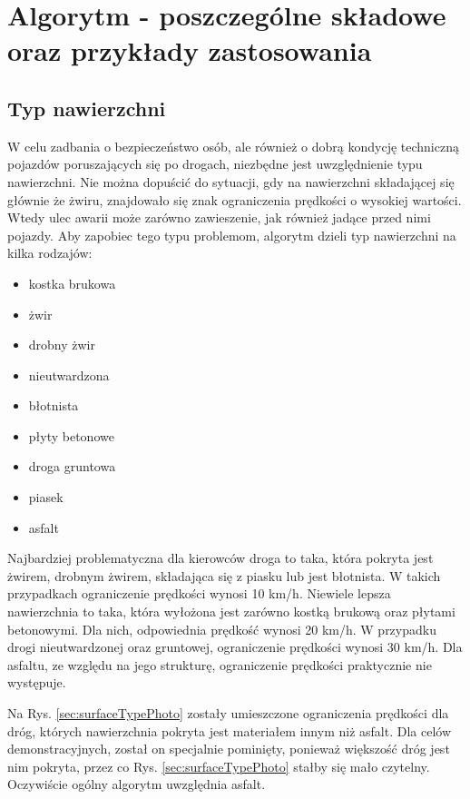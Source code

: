 \chapter{Algorytm - poszczególne składowe oraz przykłady zastosowania}
\label{cha:AlgorytmPraktyka}

\section{Typ nawierzchni}
\label{sec:surfaceType}

W celu zadbania o bezpieczeństwo osób, ale również o dobrą kondycję techniczną pojazdów poruszających się po drogach, niezbędne jest uwzględnienie typu nawierzchni. Nie można dopuścić do sytuacji, gdy na nawierzchni składającej się głównie że żwiru, znajdowało się znak ograniczenia prędkości o wysokiej wartości. Wtedy ulec awarii może zarówno zawieszenie, jak również jadące przed nimi pojazdy. Aby zapobiec tego typu problemom, algorytm dzieli typ nawierzchni na kilka rodzajów:

\begin{itemize}
\item kostka brukowa
\item żwir
\item drobny żwir
\item nieutwardzona
\item błotnista
\item płyty betonowe
\item droga gruntowa
\item piasek
\item asfalt
\end{itemize}

Najbardziej problematyczna dla kierowców droga to taka, która pokryta jest żwirem, drobnym żwirem, składająca się z piasku lub jest błotnista. W takich przypadkach ograniczenie prędkości wynosi 10 km/h. Niewiele lepsza nawierzchnia to taka, która wyłożona jest zarówno kostką brukową oraz płytami betonowymi. Dla nich, odpowiednia prędkość wynosi 20 km/h. W przypadku drogi nieutwardzonej oraz gruntowej, ograniczenie prędkości wynosi 30 km/h. Dla asfaltu, ze względu na jego strukturę, ograniczenie prędkości praktycznie nie występuje.

Na Rys. \ref{sec:surfaceTypePhoto} zostały umieszczone ograniczenia prędkości dla dróg, których nawierzchnia pokryta jest materiałem innym niż asfalt. Dla celów demonstracyjnych, został on specjalnie pominięty, ponieważ większość dróg jest nim pokryta, przez co Rys. \ref{sec:surfaceTypePhoto} stałby się mało czytelny. Oczywiście ogólny algorytm uwzględnia asfalt.

